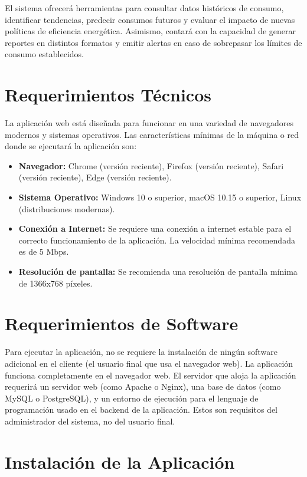 \documentclass{article}
\begin{document}
El sistema ofrecerá herramientas para consultar datos históricos de consumo, identificar tendencias, predecir consumos futuros y evaluar el impacto de nuevas políticas 
de eficiencia energética. Asimismo, contará con la capacidad de generar reportes en distintos formatos y emitir alertas en caso de sobrepasar los límites de consumo 
establecidos.


\section*{Requerimientos Técnicos}

La aplicación web está diseñada para funcionar en una variedad de navegadores modernos y sistemas operativos.  Las características mínimas de la máquina o red donde se 
ejecutará la aplicación son:

\begin{itemize}
    \item \textbf{Navegador:}  Chrome (versión reciente), Firefox (versión reciente), Safari (versión reciente), Edge (versión reciente).
    \item \textbf{Sistema Operativo:} Windows 10 o superior, macOS 10.15 o superior, Linux (distribuciones modernas).
    \item \textbf{Conexión a Internet:}  Se requiere una conexión a internet estable para el correcto funcionamiento de la aplicación.  La velocidad mínima recomendada es de 5 Mbps.
    \item \textbf{Resolución de pantalla:}  Se recomienda una resolución de pantalla mínima de 1366x768 píxeles.
\end{itemize}


\section*{Requerimientos de Software}

Para ejecutar la aplicación, no se requiere la instalación de ningún software adicional en el cliente (el usuario final que usa el navegador web).  La aplicación funciona completamente en el navegador web.   El servidor que aloja la aplicación requerirá un servidor web (como Apache o Nginx), una base de datos (como MySQL o PostgreSQL), y un entorno de ejecución para el lenguaje de programación usado en el backend de la aplicación.  Estos son requisitos del administrador del sistema, no del usuario final.

\section*{Instalación de la Aplicación}
\end{document}
